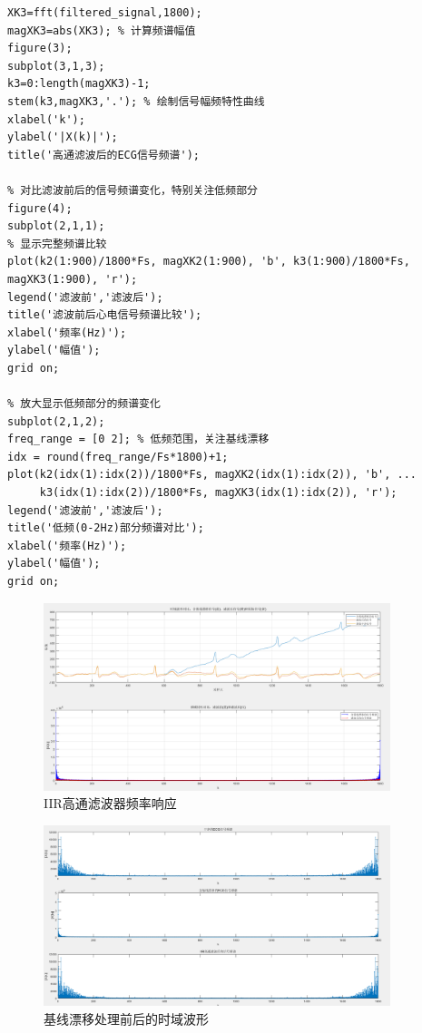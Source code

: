 \documentclass[12pt,hyperref,a4paper,UTF8]{ctexart}
\begin{document}
\begin{lstlisting}[style=matlab, caption={高通滤波器设计与实现}]
% 计算并绘制滤波后信号的频谱
XK3=fft(filtered_signal,1800);
magXK3=abs(XK3); % 计算频谱幅值
figure(3);
subplot(3,1,3);
k3=0:length(magXK3)-1;
stem(k3,magXK3,'.'); % 绘制信号幅频特性曲线
xlabel('k');
ylabel('|X(k)|');
title('高通滤波后的ECG信号频谱');

% 对比滤波前后的信号频谱变化，特别关注低频部分
figure(4);
subplot(2,1,1);
% 显示完整频谱比较
plot(k2(1:900)/1800*Fs, magXK2(1:900), 'b', k3(1:900)/1800*Fs, magXK3(1:900), 'r');
legend('滤波前','滤波后');
title('滤波前后心电信号频谱比较');
xlabel('频率(Hz)');
ylabel('幅值');
grid on;

% 放大显示低频部分的频谱变化
subplot(2,1,2);
freq_range = [0 2]; % 低频范围，关注基线漂移
idx = round(freq_range/Fs*1800)+1;
plot(k2(idx(1):idx(2))/1800*Fs, magXK2(idx(1):idx(2)), 'b', ...
     k3(idx(1):idx(2))/1800*Fs, magXK3(idx(1):idx(2)), 'r');
legend('滤波前','滤波后');
title('低频(0-2Hz)部分频谱对比');
xlabel('频率(Hz)');
ylabel('幅值');
grid on;
\end{lstlisting}

\begin{figure}[H] %
        \centering
        \includegraphics[width=0.9\textwidth]{figures/4_1.png} %
        \caption{IIR高通滤波器频率响应} %
        \label{fig:4_1} %
\end{figure}

\begin{figure}[H] %
        \centering
        \includegraphics[width=0.9\textwidth]{figures/4_2.png} %
        \caption{基线漂移处理前后的时域波形} %
        \label{fig:4_2} %
\end{figure}
\end{document}
